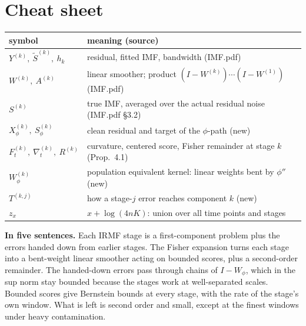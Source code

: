 \documentclass[11pt]{article}
\newcommand{\IMFt}{\widetilde S}
\begin{document}
\section{Cheat sheet}

\begin{center}\small
\begin{tabular}{ll}
\toprule
symbol & meaning (source)\\
\midrule
\(Y^{(k)},\ \IMFt^{(k)},\ h_k\) & residual, fitted IMF, bandwidth (IMF.pdf)\\
\(W^{(k)},\ A^{(k)}\) & linear smoother; product \((I-W^{(k)})\cdots(I-W^{(1)})\) (IMF.pdf)\\
\(S^{(k)}\) & true IMF, averaged over the actual residual noise (IMF.pdf \S3.2)\\
\(X^{(k)}_\phi,\ S^{(k)}_\phi\) & clean residual and target of the \(\phi\)-path (new)\\
\(F^{(k)}_t,\ \nabla^{(k)}_t,\ R^{(k)}\) & curvature, centered score, Fisher remainder at stage \(k\) (Prop.~4.1)\\
\(W^{(k)}_\phi\) & population equivalent kernel: linear weights bent by \(\phi''\) (new)\\
\(T^{(k,j)}\) & how a stage-\(j\) error reaches component \(k\) (new)\\
\(z_x\) & \(x+\log(4nK)\): union over all time points and stages\\
\bottomrule
\end{tabular}
\end{center}

\begin{idea}
\textbf{In five sentences.}  Each IRMF stage is a first-component problem
plus the errors handed down from earlier stages.  The Fisher expansion turns
each stage into a bent-weight linear smoother acting on bounded scores, plus
a second-order remainder.  The handed-down errors pass through chains of
\(I-W_\phi\), which in the sup norm stay bounded because the stages work at
well-separated scales.  Bounded scores give Bernstein bounds at every stage,
with the rate of the stage's own window.  What is left is second order and
small, except at the finest windows under heavy contamination.
\end{idea}
\end{document}
